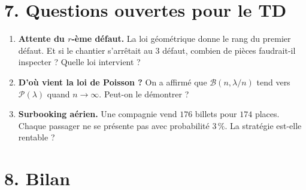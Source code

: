 \section*{7. Questions ouvertes pour le TD}

\begin{enumerate}
  \item \textbf{Attente du $r$-ème défaut.}
    La loi géométrique donne le rang du premier défaut.
    Et si le chantier s'arrêtait au 3 défaut,
    combien de pièces faudrait-il inspecter ?
    Quelle loi intervient ?

  \item \textbf{D'où vient la loi de Poisson ?}
    On a affirmé que $\mathcal{B}(n, \lambda/n)$
    tend vers $\mathcal{P}(\lambda)$ quand $n \to \infty$.
    Peut-on le démontrer ?

  \item \textbf{Surbooking aérien.}
    Une compagnie vend $176$ billets pour $174$ places.
    Chaque passager ne se présente pas avec probabilité $3\,\%$.
    La stratégie est-elle rentable ?
\end{enumerate}

\section*{8. Bilan}



